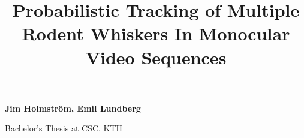 \documentclass{article}
\begin{document}
\title{\bf Probabilistic Tracking of Multiple Rodent Whiskers In Monocular Video Sequences}

\date{}
\maketitle
\thispagestyle{empty}
\pagestyle{empty}

{\bf Jim Holmström, \; Emil Lundberg}

Bachelor's Thesis at CSC, KTH













{}

\end{document}
